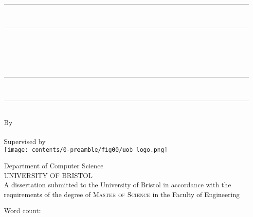 \begin{titlepage}
    \centering

    \vspace*{2.2cm}

    \rule{\textwidth}{2pt} \\[-2ex]
    \rule{\textwidth}{0.5pt} \\[0.7cm]

    {\LARGE\bfseries \myReportTitle} \\[0.3cm]

    \parbox{0.89\textwidth}{\centering
        {\large \textit{\myReportSubtitle}}
    } \\[0.3cm]

    \rule{\textwidth}{0.5pt} \\[-2ex]
    \rule{\textwidth}{2pt} \\[0.3cm]

    {\large By} \\[0.3cm]
    {\large \myName} \\[0.3cm]
    {\normalsize Supervised by \mySupervisor} \\[1cm]

    \texttt{[image: contents/0-preamble/fig00/uob\_logo.png]} \\[1cm]

    \begin{minipage}{0.65\textwidth}
        \centering
        {\Large Department of Computer Science} \\[0.3cm]
        {\Large \textsc{UNIVERSITY OF BRISTOL}} \\[1cm]
        {\normalsize A dissertation submitted to the University of Bristol
        in accordance with the requirements of the degree of \textsc{Master of Science}
        in the Faculty of Engineering} \\[1cm]
        {\large \mySubmissionMonthYear}
    \end{minipage}

    \vspace*{1cm}


    \begin{flushright}
        Word count: \wordCount
    \end{flushright}

    \vspace*{2.2cm}

\end{titlepage}